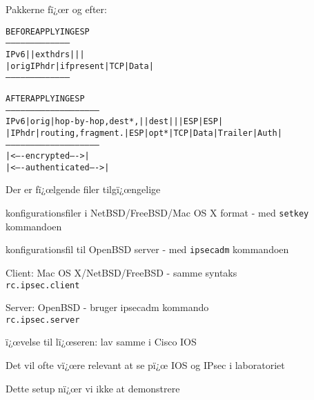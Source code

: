 
Pakkerne fï¿œr og efter:
\begin{alltt}
\small
               BEFORE APPLYING ESP
         ---------------------------------------
   IPv6  |             | ext hdrs |     |      |
         | orig IP hdr |if present| TCP | Data |
         ---------------------------------------



               AFTER APPLYING ESP
         ---------------------------------------------------------
   IPv6  | orig |hop-by-hop,dest*,|   |dest|   |    | ESP   | ESP|
         |IP hdr|routing,fragment.|ESP|opt*|TCP|Data|Trailer|Auth|
         ---------------------------------------------------------
                                   |<---- encrypted ---->|
                               |<---- authenticated ---->|
\end{alltt}


\begin{list1}
\item Der er fï¿œlgende filer tilgï¿œngelige\\
  \begin{list2}
  \item konfigurationsfiler i NetBSD/FreeBSD/Mac OS X format - med
    \verb+setkey+ kommandoen
  \item konfigurationsfil til OpenBSD server - med \verb+ipsecadm+
    kommandoen
  \end{list2}
\end{list1}




\begin{list1}
  \item Client: Mac OS X/NetBSD/FreeBSD - samme syntaks\\
\verb+rc.ipsec.client+

\item Server: OpenBSD - bruger ipsecadm kommando\\
\verb+rc.ipsec.server+

\item ï¿œvelse til lï¿œseren: lav samme i Cisco IOS
\item Det vil ofte vï¿œre relevant at se pï¿œ IOS og IPsec i laboratoriet
\item Dette setup nï¿œr vi ikke at demonstrere
\end{list1}

